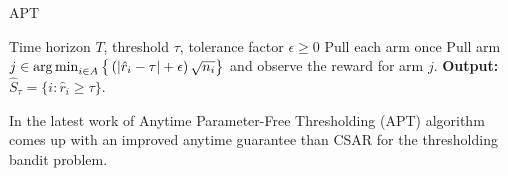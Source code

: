 
\begin{algorithm}[!h]
\caption{APT}
\label{alg:apt}
\begin{algorithmic}
 Time horizon $T$, threshold $\tau$, tolerance factor $\epsilon\geq 0$
\State Pull each arm once
\State {}
\State Pull arm $j\in\operatorname*{arg\,min}_{i\in A}\big\lbrace \left(|\hat{r}_{i} - \tau | + \epsilon\right)\sqrt{n_i}\big\rbrace$ and observe the reward for arm $j$.
\EndFor
\State \textbf{Output:} $\hat{S}_{\tau}=\lbrace i: \hat{r}_{i}\geq \tau \rbrace$.
\end{algorithmic}
\end{algorithm}


In the latest work of \citet{locatelli2016optimal} Anytime Parameter-Free Thresholding (APT) algorithm comes up with an improved anytime guarantee than CSAR for the thresholding bandit problem.	